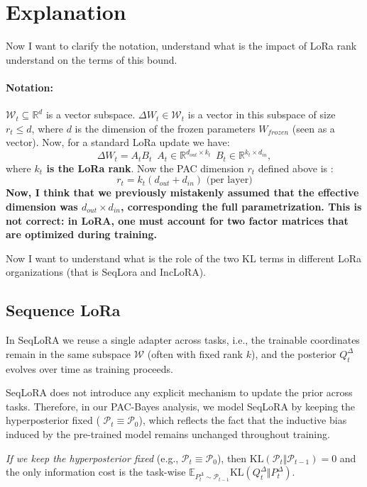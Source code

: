 \documentclass{article}
\theoremstyle{plain}
\theoremstyle{definition}
\theoremstyle{remark}
\begin{document}
\section{Explanation}
Now I want to clarify the notation, understand what is the impact of LoRa rank  understand on the terms of this bound. 

\paragraph{Notation:} $\mathcal{W}_t \subseteq \mathbb{R}^{d}$ is a vector subspace. $\Delta W_t \in \mathcal{W}_t$ is a vector in this subspace of size $r_t \leq d$, where $d$ is the dimension of the frozen parameters $W_{frozen}$ (seen as a vector). Now, for a standard LoRa update we have:
\begin{equation}
    \Delta W_t = A_t B_t \,\,\, A_t \in \mathbb{R}^{d_{out} \times k_t}\;\, B_t \in \mathbb{R}^{{k_t} \times d_{in}},
\end{equation}
where \textbf{$k_t$ is the LoRa rank}. Now the PAC dimension $r_t$ defined above is :
\begin{equation}
    r_t = k_t (d_{out} + d_{in}) \,\, \text{(per layer)}
\end{equation}
\textbf{Now, I think that we previously mistakenly assumed that the effective dimension was $d_{out} \times d_{in}$, corresponding the full parametrization. 
This is not correct: in LoRA, one must account for two factor matrices that are optimized during training.}

Now I want to understand what is the role of the two KL terms in different LoRa organizations (that is SeqLora and IncLoRA).

\subsection{Sequence LoRa}
In SeqLoRA we reuse a single adapter across tasks, i.e., the trainable coordinates remain in the same
subspace $\mathcal W$ (often with fixed rank $k$), and the posterior $Q_t^\Delta$ evolves over time as training proceeds.

SeqLoRA does not introduce any explicit mechanism to update the prior across tasks.
Therefore, in our PAC-Bayes analysis, we model SeqLoRA by keeping the hyperposterior fixed ( $\mathcal P_t\equiv \mathcal P_0$), which reflects the fact that the inductive bias induced by the pre-trained model remains unchanged throughout training.

\emph{If we keep the hyperposterior fixed} (e.g., $\mathcal P_t\equiv \mathcal P_0$), then
$\mathrm{KL}(\mathcal P_t\Vert\mathcal P_{t-1})=0$ and the only information cost is the task-wise
$\mathbb E_{P_t^\Delta\sim\mathcal P_{t-1}} \mathrm{KL}(Q_t^\Delta\Vert P_t^\Delta)$.
\end{document}
